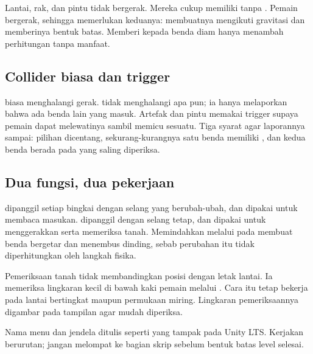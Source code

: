 Lantai, rak, dan pintu tidak bergerak. Mereka cukup memiliki 
tanpa . Pemain bergerak, sehingga memerlukan keduanya:
 membuatnya mengikuti gravitasi dan 
memberinya bentuk batas. Memberi  kepada benda diam hanya
menambah perhitungan tanpa manfaat.

\subsection*{Collider biasa dan trigger}

 biasa menghalangi gerak.  tidak
menghalangi apa pun; ia hanya melaporkan bahwa ada benda lain yang masuk.
Artefak dan pintu memakai trigger supaya pemain dapat melewatinya sambil
memicu sesuatu. Tiga syarat agar laporannya sampai: pilihan 
dicentang, sekurang-kurangnya satu benda memiliki , dan
kedua benda berada pada  yang saling diperiksa.

\subsection*{Dua fungsi, dua pekerjaan}

 dipanggil setiap bingkai dengan selang yang berubah-ubah, dan
dipakai untuk membaca masukan.  dipanggil dengan selang
tetap, dan dipakai untuk menggerakkan  serta memeriksa tanah.
Memindahkan  melalui  pada
 membuat benda bergetar dan menembus dinding, sebab perubahan itu
tidak diperhitungkan oleh langkah fisika.

Pemeriksaan tanah tidak membandingkan posisi dengan letak lantai. Ia memeriksa
lingkaran kecil di bawah kaki pemain melalui .
Cara itu tetap bekerja pada lantai bertingkat maupun permukaan miring.
Lingkaran pemeriksaannya digambar pada tampilan  agar mudah
diperiksa.


Nama menu dan jendela ditulis seperti yang tampak pada Unity LTS. Kerjakan
berurutan; jangan melompat ke bagian skrip sebelum bentuk batas level selesai.

